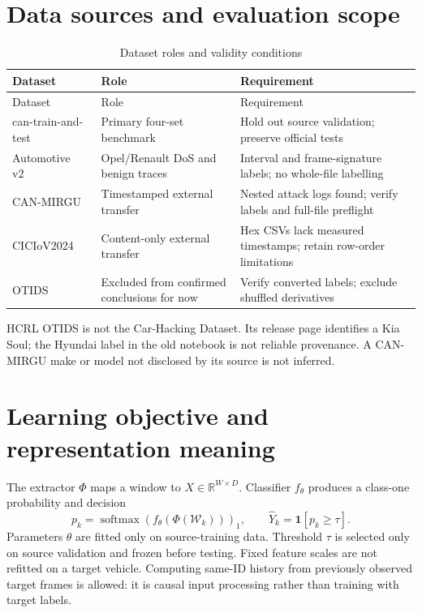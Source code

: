 \documentclass[12pt,a4paper,oneside,openany]{extbook}
\begin{document}
\section{Data sources and evaluation scope}
\begin{longtable}{P{3.3cm}P{4.4cm}P{5.2cm}}
\caption{Dataset roles and validity conditions}\label{tab:datasets}\\\toprule
Dataset & Role & Requirement\\\midrule\endfirsthead
\toprule Dataset & Role & Requirement\\\midrule\endhead
can-train-and-test~\cite{lampe2024curated} & Primary four-set benchmark & Hold out source validation; preserve official tests\\
Automotive v2~\cite{dupont2019automotive} & Opel/Renault DoS and benign traces & Interval and frame-signature labels; no whole-file labelling\\
CAN-MIRGU~\cite{rajapaksha2024canmirgu} & Timestamped external transfer & Nested attack logs found; verify labels and full-file preflight\\
CICIoV2024~\cite{neto2024ciciov2024} & Content-only external transfer & Hex CSVs lack measured timestamps; retain row-order limitations\\
OTIDS~\cite{lee2017otids} & Excluded from confirmed conclusions for now & Verify converted labels; exclude shuffled derivatives\\\bottomrule
\end{longtable}
HCRL OTIDS is not the Car-Hacking Dataset. Its release page identifies a Kia Soul; the Hyundai label in the old notebook is not reliable provenance. A CAN-MIRGU make or model not disclosed by its source is not inferred.

\section{Learning objective and representation meaning}
The extractor $\Phi$ maps a window to $X\in\mathbb R^{W\times D}$. Classifier $f_\theta$ produces a class-one probability and decision
\begin{equation}
p_k=\operatorname{softmax}(f_\theta(\Phi(\mathcal W_k)))_1,
\qquad \widehat Y_k=\mathbf{1}[p_k\geq\tau].
\end{equation}
Parameters $\theta$ are fitted only on source-training data. Threshold $\tau$ is selected only on source validation and frozen before testing. Fixed feature scales are not refitted on a target vehicle. Computing same-ID history from previously observed target frames is allowed: it is causal input processing rather than training with target labels.
\end{document}
